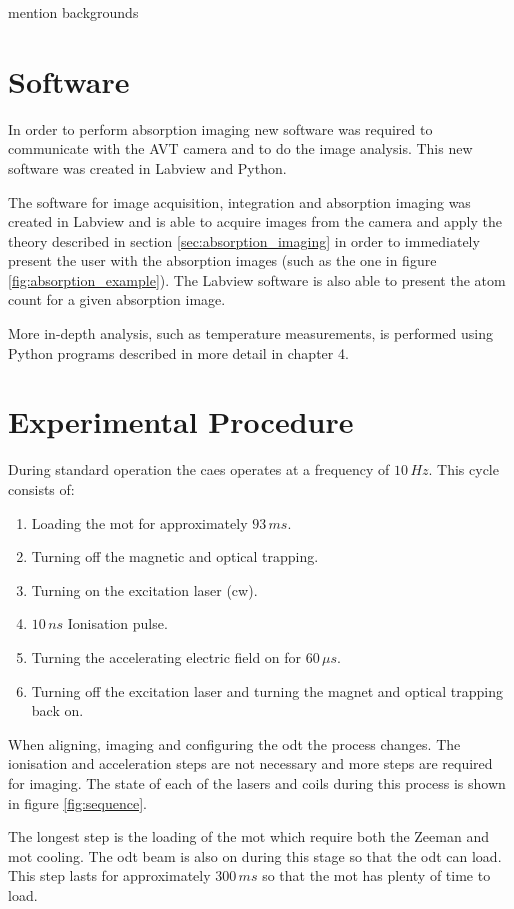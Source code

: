 {\color{red} mention backgrounds}

\section{Software}

In order to perform absorption imaging new software was required to communicate with the AVT camera and to do the image analysis. This new software was created in Labview and Python.

The software for image acquisition, integration and absorption imaging was created in Labview and is able to acquire images from the camera and apply the theory described in section \ref{sec:absorption_imaging} in order to immediately present the user with the absorption images (such as the one in figure \ref{fig:absorption_example}). The Labview software is also able to present the atom count for a given absorption image.

More in-depth analysis, such as temperature measurements, is performed using Python programs described in more detail in chapter 4.

\section{Experimental Procedure}

During standard operation the \gls{caes} operates at a frequency of $10\,\unit{Hz}$. This cycle consists of:
\begin{enumerate}
\item Loading  the \gls{mot} for approximately $93\,\unit{ms}$.
\item Turning off the magnetic and optical trapping.
\item Turning on the excitation laser (\gls{cw}).
\item $10\,\unit{ns}$ Ionisation pulse.
\item Turning the accelerating electric field on for $60\,\unit{\mu s}$.
\item Turning off the excitation laser and turning the magnet and optical trapping back on.
\end{enumerate}

When aligning, imaging and configuring the \gls{odt} the process changes. The ionisation and acceleration steps are not necessary and more steps are required for imaging. The state of each of the lasers and coils during this process is shown in figure \ref{fig:sequence}.

The longest step is the loading of the \gls{mot} which require both the Zeeman and \gls{mot} cooling. The \gls{odt} beam is also on during this stage so that the \gls{odt} can load. This step lasts for approximately $300\,\unit{ms}$ so that the \gls{mot} has plenty of time to load. 

